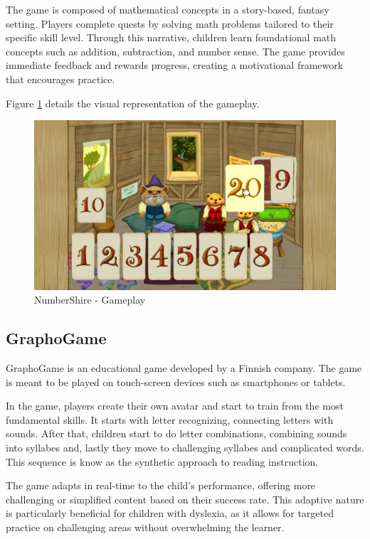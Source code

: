 The game is composed of mathematical concepts in a story-based, fantasy setting. Players complete quests by solving math problems tailored to their specific skill level. Through this narrative, children learn foundational math concepts such as addition, subtraction, and number sense. The game provides immediate feedback and rewards progress, creating a motivational framework that encourages practice.

Figure \ref{fig:numberShire} details the visual representation of the gameplay.

\begin{figure}[!h]
    \centering
    \includegraphics[width=0.8\linewidth]{Chapters/related_work_img/NumberShire_gameplay02.jpg}
    \caption{NumberShire - Gameplay}
    \label{fig:numberShire}
\end{figure}


\subsection*{GraphoGame}

GraphoGame \cite{graphogamesoftware} is an educational game developed by a Finnish company. The game is meant to be played on touch-screen devices such as smartphones or tablets.

In the game, players create their own avatar and start to train from the most fundamental skills. It starts with letter recognizing, connecting letters with sounds. After that, children start to do letter combinations, combining sounds into syllabes and, lastly they move to challenging syllabes and complicated words. This sequence is know as the synthetic approach to reading instruction.

The game adapts in real-time to the child’s performance, offering more challenging or simplified content based on their success rate. This adaptive nature is particularly beneficial for children with dyslexia, as it allows for targeted practice on challenging areas without overwhelming the learner.

